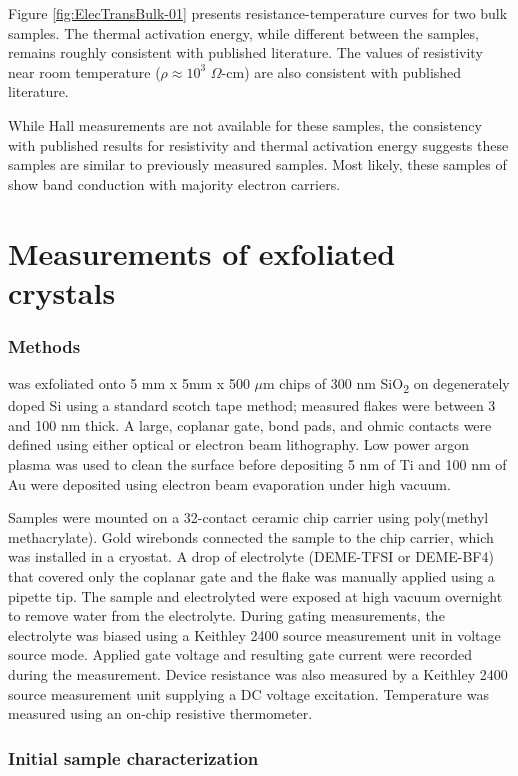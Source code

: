 Figure \ref{fig:ElecTransBulk-01} presents resistance-temperature curves for two bulk \rucl samples. The thermal activation energy, while different between the samples, remains roughly consistent with published literature. The values of resistivity near room temperature ($\rho \approx 10^{3}$ $\Omega$-cm) are also consistent with published literature.

While Hall measurements are not available for these samples, the consistency with published results for resistivity and thermal activation energy suggests these samples are similar to previously measured samples. Most likely, these samples of \rucl show band conduction with majority electron carriers.

\section{Measurements of exfoliated \texorpdfstring{\rucl}{RuCl3}crystals}

\subsubsection{Methods}
\rucl was exfoliated onto 5 mm x 5mm x 500 $\mu$m chips of 300 nm SiO\textsubscript{2} on degenerately doped Si using a standard scotch tape method; measured \rucl flakes were between 3 and 100 nm thick. A large, coplanar gate, bond pads, and ohmic contacts were defined using either optical or electron beam lithography. Low power argon plasma was used to clean the surface before depositing 5 nm of Ti and 100 nm of Au were deposited using electron beam evaporation under high vacuum.

Samples were mounted on a 32-contact ceramic chip carrier using poly(methyl methacrylate). Gold wirebonds connected the sample to the chip carrier, which was installed in a cryostat. A drop of electrolyte (DEME-TFSI or DEME-BF4) that covered only the coplanar gate and the \rucl flake was manually applied using a pipette tip. The sample and electrolyted were exposed at high vacuum overnight to remove water from the electrolyte. During gating measurements, the electrolyte was biased using a Keithley 2400 source measurement unit in voltage source mode. Applied gate voltage and resulting gate current were recorded during the measurement. Device resistance was also measured by a Keithley 2400 source measurement unit supplying a DC voltage excitation. Temperature was measured using an on-chip resistive thermometer.

\subsubsection{Initial sample characterization}

